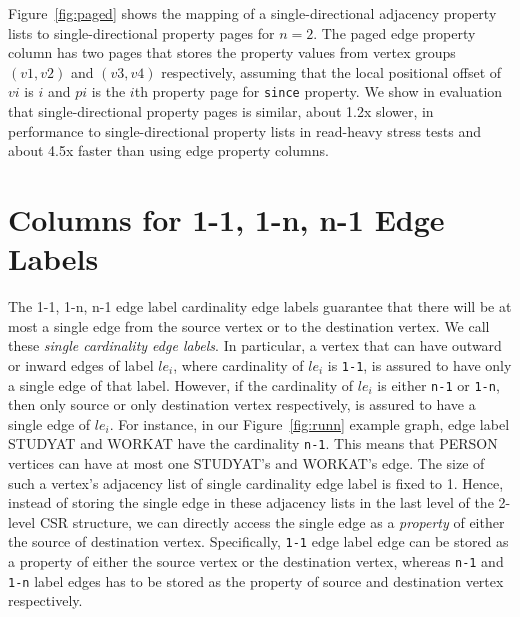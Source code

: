 Figure~\ref{fig:paged} shows the mapping of a single-directional adjacency property lists to single-directional  property pages for $n=2$. The paged edge property column has two pages that stores the property values from vertex groups $(v1,v2)$ and $(v3,v4)$ respectively, assuming that the local positional offset of $vi$ is $i$ and $pi$ is the $i$th property page for \texttt{since} property. 
We show in evaluation that single-directional  property pages is similar, about 1.2x slower, in performance to single-directional property lists in read-heavy stress tests and about 4.5x faster than using edge property columns.

\section{Columns for 1-1, 1-n, n-1 Edge Labels}
\label{sec:single-cardinality-cols}

The 1-1, 1-n, n-1 edge label cardinality edge labels guarantee that there will be at most a single edge from the source vertex or to the destination vertex. We call these \emph{single cardinality edge labels}. In particular, a vertex that can have outward or inward edges of label $le_i$, where cardinality of $le_i$ is \texttt{1-1}, is assured to have only a single edge of that label. However, if the cardinality of $le_i$ is either \texttt{n-1} or \texttt{1-n}, then only source or only destination vertex respectively, is assured to have a single edge of $le_i$. For instance, in our Figure~\ref{fig:runn} example graph, edge label STUDYAT and WORKAT have the cardinality \texttt{n-1}. This means that PERSON vertices can have at most one STUDYAT's and WORKAT's edge. The size of such a vertex's adjacency list of single cardinality edge label is fixed to 1. Hence, instead of storing the single edge in these adjacency lists in the last level of the 2-level CSR structure, we can directly access the single edge as a \emph{property} of either the source of destination vertex. Specifically, \texttt{1-1} edge label edge can be stored as a property of either the source vertex or the destination vertex, whereas \texttt{n-1} and \texttt{1-n} label edges has to be stored as the property of source and destination vertex respectively. 

